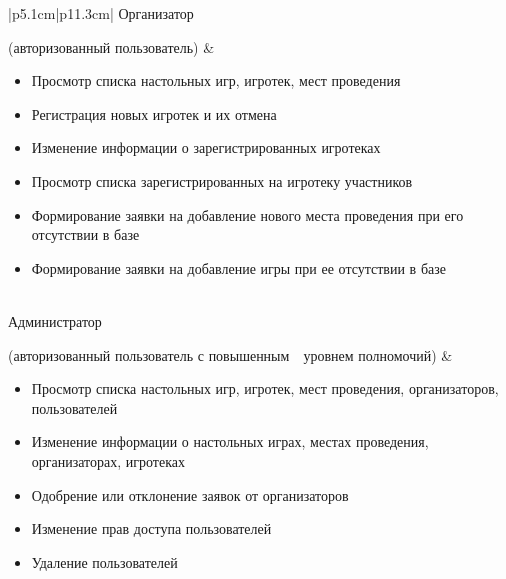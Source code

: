 \begin{table}[h!]
\begin{center}
\begin{threeparttable}
\begin{tabular}{|p{5.1cm}|p{11.3cm}|}
            Организатор \par (авторизованный пользователь)
                  & \begin{minipage}[t]{\linewidth}
                      \begin{itemize}[nosep,after=\strut]
                          \item Просмотр списка настольных игр, игротек, мест
                        проведения
                          \item Регистрация новых игротек и их отмена
                          \item Изменение информации о зарегистрированных
                              игротеках
                          \item Просмотр списка зарегистрированных на
                              \mbox{игротеку} участников
                          \item Формирование заявки на добавление нового
                              \mbox{места} проведения при его отсутствии в базе
                          \item Формирование заявки на добавление игры при ее
                        отсутствии в базе
                      \end{itemize}
                  \end{minipage}\\
            \hline
            Администратор \par (авторизованный пользователь
                    с \mbox{повышенным~~уровнем} полномочий)
                  & \begin{minipage}[t]{\linewidth}
                      \begin{itemize}[nosep,after=\strut]
                          \item Просмотр списка настольных игр, игротек, мест
                        проведения, организаторов, пользователей
                    \item Изменение информации о настольных играх, \mbox{местах}
                        проведения, организаторах, игротеках
                          \item Одобрение или отклонение заявок от
                              \mbox{организаторов}
                          \item Изменение прав доступа пользователей
                          \item Удаление пользователей
                      \end{itemize}
                  \end{minipage}\\
            \hline
        \end{tabular}
    \end{threeparttable}
    \end{center}
\end{table} 

